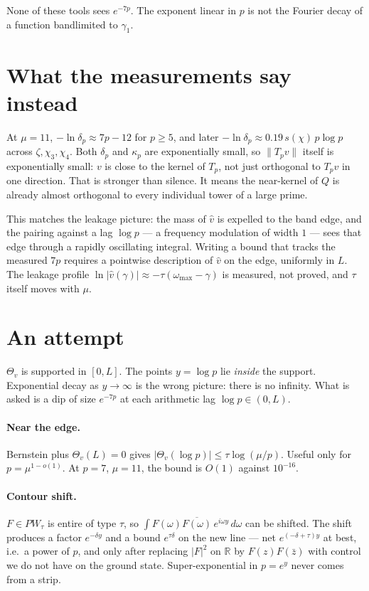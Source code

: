 \documentclass[11pt]{article}
\theoremstyle{remark}\newtheorem*{remark}{Remark}
\begin{document}
None of these tools sees $e^{-7p}$. The exponent linear in $p$ is not
the Fourier decay of a function bandlimited to $\gamma_1$.

\section{What the measurements say instead}
At $\mu=11$, $-\ln\delta_p\approx7p-12$ for $p\ge5$, and later
$-\ln\delta_p\approx0.19\,s(\chi)\,p\log p$ across $\zeta,\chi_3,\chi_4$.
Both $\delta_p$ and $\kappa_p$ are exponentially small, so
$\|T_pv\|$ itself is exponentially small: $v$ is close to the kernel
of $T_p$, not just orthogonal to $T_pv$ in one direction. That is
stronger than silence. It means the near-kernel of $Q$ is already
almost orthogonal to every individual tower of a large prime.

This matches the leakage picture: the mass of $\hat v$ is expelled to
the band edge, and the pairing against a lag $\log p$ --- a frequency
modulation of width $1$ --- sees that edge through a rapidly
oscillating integral. Writing a bound that tracks the measured $7p$
requires a pointwise description of $\hat v$ on the edge, uniformly in
$L$. The leakage profile $\ln|\hat v(\gamma)|\approx-\tau(\omega_{\max}-\gamma)$
is measured, not proved, and $\tau$ itself moves with $\mu$.

\section{An attempt}
$\Theta_v$ is supported in $[0,L]$. The points $y=\log p$ lie
\emph{inside} the support. Exponential decay as $y\to\infty$ is the
wrong picture: there is no infinity. What is asked is a dip of size
$e^{-7p}$ at each arithmetic lag $\log p\in(0,L)$.

\paragraph{Near the edge.}
Bernstein plus $\Theta_v(L)=0$ gives
$|\Theta_v(\log p)|\le\tau\log(\mu/p)$. Useful only for $p=\mu^{1-o(1)}$.
At $p=7$, $\mu=11$, the bound is $O(1)$ against $10^{-16}$.

\paragraph{Contour shift.}
$F\in PW_\tau$ is entire of type $\tau$, so $\int F(\omega)\overline{F(\omega)}\,e^{i\omega y}\,d\omega$
can be shifted. The shift produces a factor $e^{-\delta y}$ and a
bound $e^{\tau\delta}$ on the new line --- net $e^{(-\delta+\tau)y}$ at
best, i.e.\ a power of $p$, and only after replacing $|F|^2$ on
$\mathbb R$ by $F(z)F(\bar z)$ with control we do not have on the
ground state. Super-exponential in $p=e^y$ never comes from a strip.
\end{document}
